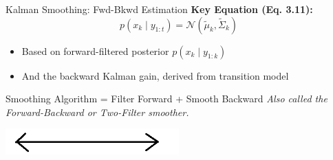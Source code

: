 \documentclass[handout,aspectratio=169]{beamer}
\begin{document}
\begin{frame}{Kalman Smoothing: Fwd-Bkwd Estimation}
\vspace{0.8em}
\textbf{Key Equation (Eq. 3.11):}
\[
p(x_k \mid y_{1:t}) = \mathcal{N}(\tilde{\mu}_k, \tilde{\Sigma}_k)
\]
\begin{itemize}
  \item Based on forward-filtered posterior \( p(x_k \mid y_{1:k}) \)
  \item And the backward Kalman gain, derived from transition model
\end{itemize}

\vspace{1em}
\begin{block}{Smoothing Algorithm = Filter Forward + Smooth Backward}
\textit{Also called the Forward-Backward or Two-Filter smoother.}
\end{block}

\vspace{1em}
\includegraphics[width=0.5\textwidth]{chapter_figs/03_figs/line.png}

\end{frame}









{
	\begin{frame}
	\end{frame}}
\end{document}
